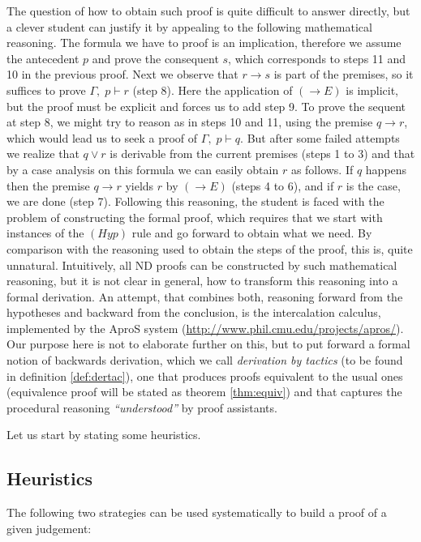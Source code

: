\documentclass[a4paper,UKenglish]{lipics}
\newcommand{\G}{\Gamma}
\begin{document}
The question of how to obtain such proof is quite difficult to answer directly, but a clever student can justify it by appealing to the
following mathematical reasoning. The formula we have to proof is an implication, therefore we assume the antecedent $p$ and prove the consequent $s$, which corresponds to steps 11 and 10 in the previous proof. Next we observe that $r\to s$ is part of the premises, so it suffices to prove $\G,\;p\vdash r$ (step 8). Here the application of $(\to E)$ is implicit, but the proof must be explicit and forces us to add step 9. To prove the sequent at step 8, we might try to reason as in steps 10 and 11, using the premise $q\to r$, which would lead us to seek a proof of $\G,\;p\vdash q$. But after some failed attempts we realize that $q\lor r$ is derivable from the current premises (steps 1 to 3) and that by a case analysis on this formula we can easily obtain $r$ as follows. If $q$ happens then the premise $q\to r$ yields $r$ by $(\to E)$ (steps 4 to 6), and if $r$ is the case, we are done (step 7).  Following this reasoning, the student is faced with the problem of constructing the formal proof, which requires that we start with instances of the $(Hyp)$ rule and go forward to obtain what we need. By comparison with the reasoning used to obtain the steps of the proof, this is, quite unnatural. Intuitively, all ND proofs can be constructed by such mathematical reasoning, but it is not clear in general, how to transform this reasoning into a formal derivation. An attempt, that combines both, reasoning forward from the hypotheses and backward from the conclusion, is the intercalation calculus, implemented by the {\sc AproS} system (\url{http://www.phil.cmu.edu/projects/apros/}).  Our purpose here is not to elaborate further on this, but to put forward a formal notion of backwards derivation, which we call {\sl derivation by tactics} (to be found in definition \ref{def:dertac}), one that produces proofs equivalent to the usual ones (equivalence proof will be stated as theorem \ref{thm:equiv}) and that captures the procedural reasoning {\sl ``understood''} by proof assistants.

\smallskip
Let us start by stating some heuristics. 

\subsection{Heuristics}\label{ssec:heu}

The following two strategies can be used systematically to build a proof of a given judgement:
\end{document}
